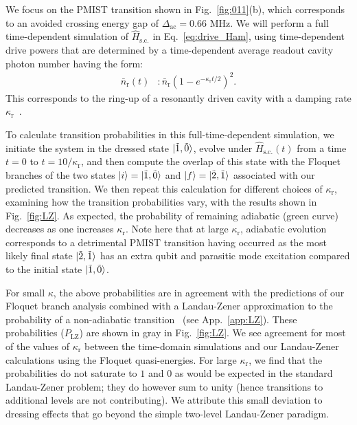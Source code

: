 \documentclass[%
reprint,
superscriptaddress,
 amsmath,amssymb,
 aps,
 prx,
longbibliography,
floatfix,
]{revtex4-2}
\begin{document}
We focus on the PMIST transition shown in Fig.~\ref{fig:011}(b), which corresponds to an avoided crossing energy gap of $\Delta_\textrm{ac}=0.66$ MHz. We will perform a full time-dependent simulation of $\hat H_\textrm{s.c.}$ in Eq.~\ref{eq:drive_Ham}, using time-dependent drive powers that are determined by a time-dependent average readout cavity photon number having the form:
\begin{align}
    \bar n_\textrm{r}(t)&:\bar n_\textrm{r}(1-e^{-\kappa_\textrm{r} t/2})^2.\label{eq:LZ-n}
\end{align}
This corresponds to the ring-up of a resonantly driven cavity with a damping rate $\kappa_\textrm{r}$~\cite{khezri2023measurement,dumas2024unified,cohen2023reminiscence}.  

To calculate transition probabilities in this full-time-dependent simulation, we initiate the system in the dressed state 
$\ket{\tilde{1},\tilde{0}}$, evolve under $\hat{H}_\textrm{s.c.}(t)$ from a time $t=0$ to $t = 10 / \kappa_\textrm{r}$, and then compute the overlap of this state with the Floquet branches of the two states $\ket{i}=\ket{\tilde{1},\tilde{0}}$ and $\ket{f}=\ket{\tilde{2},\tilde{1}}$ associated with our predicted transition.  We then repeat this calculation for different choices of $\kappa_\textrm{r}$, examining how the transition probabilities vary, with the results shown in Fig.~\ref{fig:LZ}. 
As expected, the probability of remaining adiabatic (green curve) decreases as one increases $\kappa_\textrm{r}$.  Note here that at large $\kappa_\textrm{r}$, adiabatic evolution corresponds to a detrimental PMIST transition having occurred as the most likely final state $\ket{\tilde{2}, \tilde{1}}$ has an extra qubit and parasitic mode excitation compared to the initial state $\ket{\tilde{1}, \tilde{0}}$.  


For small $\kappa$, the above probabilities are in agreement with the predictions of our Floquet branch analysis combined with a Landau-Zener approximation to the probability of a non-adiabatic transition~\cite{ikeda2022floquet,dumas2024unified} (see App.~\ref{app:LZ}).  These probabilities ($P_{\mathrm{LZ}}$) are shown in gray in Fig.~\ref{fig:LZ}. We see agreement for most of the values of $\kappa_\textrm{r}$ between the time-domain simulations and our Landau-Zener calculations using the Floquet quasi-energies. For large $\kappa_\textrm{r}$, we find that the probabilities do not saturate to $1$ and $0$ as would be expected in the standard Landau-Zener problem; they do however sum to unity (hence transitions to additional levels are not contributing).  We attribute this small deviation to dressing effects that go beyond the simple two-level Landau-Zener paradigm.
\end{document}
